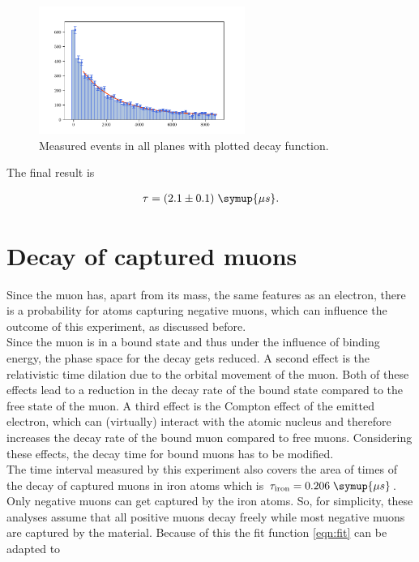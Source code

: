 

\begin{figure}
    \centering
    \includegraphics[width=0.6\textwidth]{plots/pALL.pdf}
    \caption{Measured events in all planes with plotted decay function.}
    \label{fig:pALL}
\end{figure}

The final result is 

\begin{align*}
    \tau = (2.1 \pm 0.1) \; \symup{\mu s}.
\end{align*} 

\section{Decay of captured muons}

\label{sec:muoncapture}

Since the muon has, apart from its mass, the same features as an electron, 
there is a probability for atoms capturing negative muons, which can influence
the outcome of this experiment, as discussed before. \\
Since the muon is in a bound state and thus under the influence of binding energy, 
the phase space for the decay gets reduced. A second effect is the relativistic time dilation due to the orbital movement of the muon. Both of these effects lead to a reduction in the decay rate of the bound state compared to the free state of the muon. A third effect is the Compton effect of the emitted electron, which can (virtually) interact with the atomic nucleus and therefore increases the decay rate of the bound muon compared to free muons. Considering these effects, the decay time for bound muons has to be modified\cite{bound}.\\

The time interval measured by this experiment also covers the area of times of the decay of captured muons in iron atoms which is $\tau_{\text{iron}} = 0.206 \; \symup{\mu s}$\cite{lvd}.
Only negative muons can get captured by the iron atoms. So, for simplicity, these analyses assume that all positive muons decay freely while most negative muons are captured by the material.
Because of this the fit function \ref{eqn:fit} can be adapted to 

